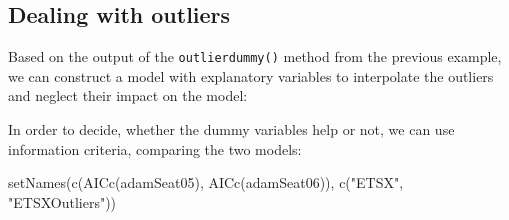 \documentclass[
]{book}
\newenvironment{Shaded}{\begin{snugshade}}{\end{snugshade}}
\newcommand{\AttributeTok}[1]{\textcolor[rgb]{0.77,0.63,0.00}{#1}}
\newcommand{\CommentTok}[1]{\textcolor[rgb]{0.56,0.35,0.01}{\textit{#1}}}
\newcommand{\DecValTok}[1]{\textcolor[rgb]{0.00,0.00,0.81}{#1}}
\newcommand{\FunctionTok}[1]{\textcolor[rgb]{0.00,0.00,0.00}{#1}}
\newcommand{\NormalTok}[1]{#1}
\newcommand{\OtherTok}[1]{\textcolor[rgb]{0.56,0.35,0.01}{#1}}
\newcommand{\SpecialCharTok}[1]{\textcolor[rgb]{0.00,0.00,0.00}{#1}}
\newcommand{\StringTok}[1]{\textcolor[rgb]{0.31,0.60,0.02}{#1}}
\theoremstyle{definition}
\theoremstyle{definition}
\theoremstyle{definition}
\theoremstyle{definition}
\theoremstyle{remark}
\begin{document}
\hypertarget{dealing-with-outliers}{%
\subsection{Dealing with outliers}\label{dealing-with-outliers}}

Based on the output of the \texttt{outlierdummy()} method from the previous example, we can construct a model with explanatory variables to interpolate the outliers and neglect their impact on the model:

\begin{Shaded}
\end{Shaded}

In order to decide, whether the dummy variables help or not, we can use information criteria, comparing the two models:

\begin{Shaded}
\begin{Highlighting}[]
\FunctionTok{setNames}\NormalTok{(}\FunctionTok{c}\NormalTok{(}\FunctionTok{AICc}\NormalTok{(adamSeat05), }\FunctionTok{AICc}\NormalTok{(adamSeat06)),}
         \FunctionTok{c}\NormalTok{(}\StringTok{"ETSX"}\NormalTok{, }\StringTok{"ETSXOutliers"}\NormalTok{))}
\end{Highlighting}
\end{Shaded}
\end{document}
